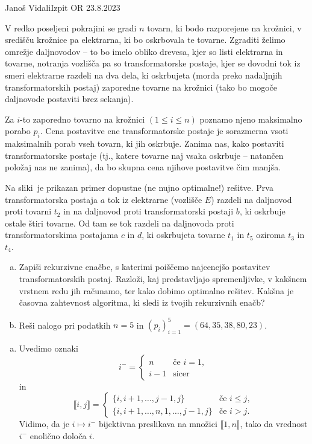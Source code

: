 \begin{naloga}{Janoš Vidali}{Izpit OR 23.8.2023}
\begin{vprasanje}
V redko poseljeni pokrajini se gradi $n$ tovarn,
ki bodo razporejene na krožnici,
v središču krož\-ni\-ce pa elektrarna, ki bo oskrbovala te tovarne.
Zgraditi želimo omrežje daljnovodov
-- to bo imelo obliko drevesa, kjer so listi elektrarna in tovarne,
notranja vozlišča pa so transformatorske postaje,
kjer se dovodni tok iz smeri elektrarne razdeli na dva dela,
ki oskrbujeta (morda preko nadaljnjih transformatorskih postaj)
zaporedne tovarne na krožnici
(tako bo mogoče daljnovode postaviti brez sekanja).

Za $i$-to zaporedno tovarno na krožnici $(1 \le i \le n)$
poznamo njeno maksimalno porabo $p_i$.
Cena postavitve ene transformatorske postaje
je sorazmerna vsoti maksimalnih porab vseh tovarn, ki jih oskrbuje.
Zanima nas,
kako postaviti transformatorske postaje
(tj., katere tovarne naj vsaka oskrbuje -- natančen položaj nas ne zanima),
da bo skup\-na cena njihove postavitve čim manjša.

Na sliki~\fig je prikazan primer dopustne (ne nujno optimalne!) rešitve.
Prva transformatorska postaja $a$ tok iz elektrarne (vozlišče $E$)
razdeli na daljnovod proti tovarni $t_2$
in na daljnovod proti transformatorski postaji $b$,
ki oskrbuje ostale štiri tovarne.
Od tam se tok razdeli na daljnovoda
proti transformatorskima postajama $c$ in $d$,
ki oskrbujeta tovarne $t_1$ in $t_5$ oziroma $t_3$ in $t_4$.

\begin{enumerate}[(a)]
\item Zapiši rekurzivne enačbe,
s katerimi poiščemo najcenejšo postavitev transformatorskih postaj.
Razloži, kaj predstavljajo spremenljivke,
v kakšnem vrstnem redu jih računamo, ter kako dobimo optimalno rešitev.
Kakšna je časovna zahtevnost algoritma, ki sledi iz tvojih rekurzivnih enačb?

\item Reši nalogo pri podatkih $n = 5$ in $(p_i)_{i=1}^5 = (64, 35, 38, 80, 23)$.
\end{enumerate}
%
\begin{slika}
\pgfslika
{}
\end{slika}
\end{vprasanje}

\begin{odgovor}
\begin{enumerate}[(a)]
\item Uvedimo oznaki
$$
i^- = \begin{cases}
n & \text{če $i = 1$}, \\
i-1 & \text{sicer}
\end{cases}
$$
in
$$
\llbracket i, j \rrbracket = \begin{cases}
\{i, i+1, \dots, j-1, j\} & \text{če $i \le j$}, \\
\{i, i+1, \dots, n, 1, \dots, j-1, j\} & \text{če $i > j$}.
\end{cases}
$$
Vidimo,
da je $i \mapsto i^-$ bijektivna preslikava
na množici $\llbracket 1, n \rrbracket$,
tako da vrednost $i^-$ enolično določa $i$.


\end{enumerate}
\end{odgovor}
\end{naloga}
